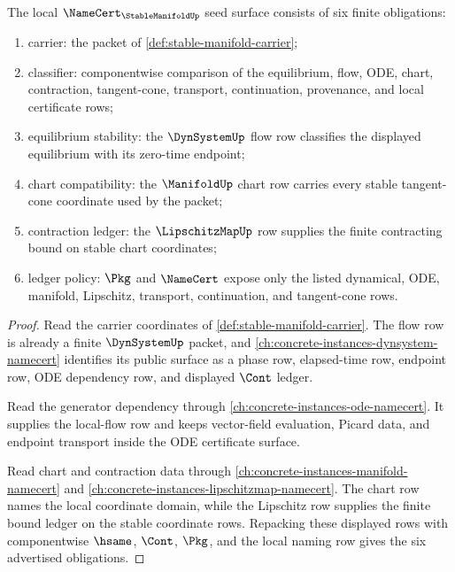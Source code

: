 \begin{theorem}
\label{thm:stable-manifold-namecert-obligations}
The local $\NameCert_{\StableManifoldUp}$ seed surface consists of six finite
obligations:
\begin{enumerate}
\item carrier: the packet of \autoref{def:stable-manifold-carrier};
\item classifier: componentwise comparison of the equilibrium, flow, ODE,
chart, contraction, tangent-cone, transport, continuation, provenance, and
local certificate rows;
\item equilibrium stability: the $\DynSystemUp$ flow row classifies the
displayed equilibrium with its zero-time endpoint;
\item chart compatibility: the $\ManifoldUp$ chart row carries every stable
tangent-cone coordinate used by the packet;
\item contraction ledger: the $\LipschitzMapUp$ row supplies the finite
contracting bound on stable chart coordinates;
\item ledger policy: $\Pkg$ and $\NameCert$ expose only the listed dynamical,
ODE, manifold, Lipschitz, transport, continuation, and tangent-cone rows.
\end{enumerate}
\end{theorem}
\begin{proof}
Read the carrier coordinates of \autoref{def:stable-manifold-carrier}. The
flow row is already a finite $\DynSystemUp$ packet, and
\autoref{ch:concrete-instances-dynsystem-namecert} identifies its public
surface as a phase row, elapsed-time row, endpoint row, ODE dependency row,
and displayed $\Cont$ ledger.

Read the generator dependency through
\autoref{ch:concrete-instances-ode-namecert}. It supplies the local-flow row
and keeps vector-field evaluation, Picard data, and endpoint transport inside
the ODE certificate surface.

Read chart and contraction data through
\autoref{ch:concrete-instances-manifold-namecert} and
\autoref{ch:concrete-instances-lipschitzmap-namecert}. The chart row names
the local coordinate domain, while the Lipschitz row supplies the finite bound
ledger on the stable coordinate rows. Repacking these displayed rows with
componentwise $\hsame$, $\Cont$, $\Pkg$, and the local naming row gives the
six advertised obligations.
\end{proof}

